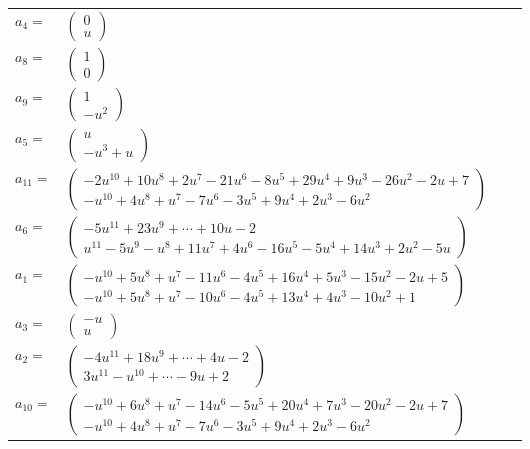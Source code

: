\documentclass[1p]{elsarticle_modified}
\theoremstyle{definition}
\begin{document}
\begin{tabular}{m{7pt} m{180pt} m{7pt} m{180pt} }
\flushright $a_{4}=$&$\begin{pmatrix}0\\u\end{pmatrix}$ \\
\flushright $a_{8}=$&$\begin{pmatrix}1\\0\end{pmatrix}$ \\
\flushright $a_{9}=$&$\begin{pmatrix}1\\- u^2\end{pmatrix}$ \\
\flushright $a_{5}=$&$\begin{pmatrix}u\\- u^3+u\end{pmatrix}$ \\
\flushright $a_{11}=$&$\begin{pmatrix}-2 u^{10}+10 u^8+2 u^7-21 u^6-8 u^5+29 u^4+9 u^3-26 u^2-2 u+7\\- u^{10}+4 u^8+u^7-7 u^6-3 u^5+9 u^4+2 u^3-6 u^2\end{pmatrix}$ \\
\flushright $a_{6}=$&$\begin{pmatrix}-5 u^{11}+23 u^9+\cdots+10 u-2\\u^{11}-5 u^9- u^8+11 u^7+4 u^6-16 u^5-5 u^4+14 u^3+2 u^2-5 u\end{pmatrix}$ \\
\flushright $a_{1}=$&$\begin{pmatrix}- u^{10}+5 u^8+u^7-11 u^6-4 u^5+16 u^4+5 u^3-15 u^2-2 u+5\\- u^{10}+5 u^8+u^7-10 u^6-4 u^5+13 u^4+4 u^3-10 u^2+1\end{pmatrix}$ \\
\flushright $a_{3}=$&$\begin{pmatrix}- u\\u\end{pmatrix}$ \\
\flushright $a_{2}=$&$\begin{pmatrix}-4 u^{11}+18 u^9+\cdots+4 u-2\\3 u^{11}- u^{10}+\cdots-9 u+2\end{pmatrix}$ \\
\flushright $a_{10}=$&$\begin{pmatrix}- u^{10}+6 u^8+u^7-14 u^6-5 u^5+20 u^4+7 u^3-20 u^2-2 u+7\\- u^{10}+4 u^8+u^7-7 u^6-3 u^5+9 u^4+2 u^3-6 u^2\end{pmatrix}$ \\

\end{tabular}
\end{document}
